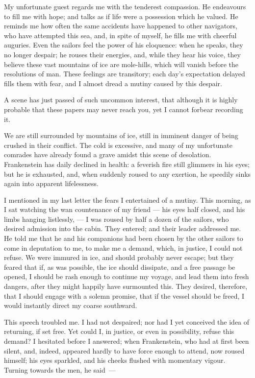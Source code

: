 My unfortunate guest regards me
with the tenderest compassion. He
endeavours to fill me with hope; and
talks as if life were a possession which
he valued. He reminds me how often
the same accidents have happened to
other navigators, who have attempted
this sea, and, in spite of myself, he fills
me with cheerful auguries. Even the
sailors feel the power of his eloquence:
when he speaks, they no longer despair;
he rouses their energies, and, while
they hear his voice, they believe these
vast mountains of ice are mole-hills,
which will vanish before the resolutions
of man. These feelings are transitory;
each day's expectation delayed fills
them with fear, and I almost dread a
mutiny caused by this despair.

\medskip
{}

A scene has just passed of such
uncommon interest, that although it is
highly probable that these papers may
never reach you, yet I cannot forbear
recording it.

We are still surrounded by mountains
of ice, still in imminent danger
of being crushed in their conflict.
The cold is excessive, and many of
my unfortunate comrades have already
found a grave amidst this scene of
desolation. Frankenstein has daily
declined in health: a feverish fire still
glimmers in his eyes; but he is exhausted,
and, when suddenly roused to
any exertion, he speedily sinks again
into apparent lifelessness.

I mentioned in my last letter the
fears I entertained of a mutiny. This
morning, as I sat watching the wan
countenance of my friend --- his eyes
half closed, and his limbs hanging
listlessly, --- I was roused by half a dozen
of the sailors, who desired admission
into the cabin. They entered; and their
leader addressed me. He told me that
he and his companions had been chosen
by the other sailors to come in deputation
to me, to make me a demand,
which, in justice, I could not refuse.
We were immured in ice, and should
probably never escape; but they feared
that if, as was possible, the ice should
dissipate, and a free passage be opened,
I should be rash enough to continue
my voyage, and lead them into fresh
dangers, after they might happily have
surmounted this. They desired, therefore,
that I should engage with a solemn
promise, that if the vessel should
be freed, I would instantly direct my
coarse southward.

This speech troubled me. I had
not despaired; nor had I yet conceived
the idea of returning, if set free. Yet
could I, in justice, or even in possibility,
refuse this demand? I hesitated
before I answered; when Frankenstein,
who had at first been silent, and, indeed,
appeared hardly to have force
enough to attend, now roused himself;
his eyes sparkled, and his cheeks
flushed with momentary vigour. Turning
towards the men, he said~---

